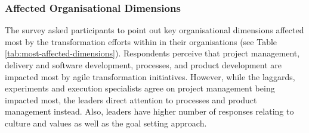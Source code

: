 \documentclass{article}
\begin{document}
\subsubsection{Affected Organisational Dimensions}

The survey asked participants to point out key organisational dimensions affected most by the transformation efforts within in their organisations (see Table \ref{tab:most-affected-dimensions}).
Respondents perceive that project management, delivery and software development, processes, and product development are impacted most by agile transformation initiatives. However, while the laggards, experiments and execution specialists agree on project management being impacted most, the leaders direct attention to processes and product management instead. Also, leaders have higher number of responses relating to culture and values as well as the goal setting approach.
\end{document}
